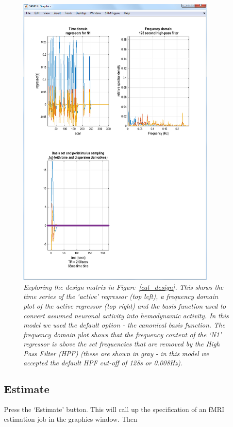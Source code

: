 \begin{figure}
\begin{center}
\includegraphics[width=100mm]{faces/cat_explore}
\caption{\em Exploring the design matrix in Figure~\ref{cat_design}. This shows the time series of the `active' regressor (top left), a frequency domain plot of the active regressor (top right) and the basis function used to convert assumed neuronal activity into hemodynamic activity. In this model we used the default option - the canonical basis function. The frequency domain plot shows that the frequency content of the `N1' regressor is above the set frequencies that are removed by the High Pass Filter (HPF) (these are shown in gray - in this model we accepted the default HPF cut-off of 128s or 0.008Hz). \label{cat_explore}}
\end{center}
\end{figure}

\subsection{Estimate}

Press the `Estimate' button. This will call up the specification of an fMRI estimation job in the graphics window. Then

